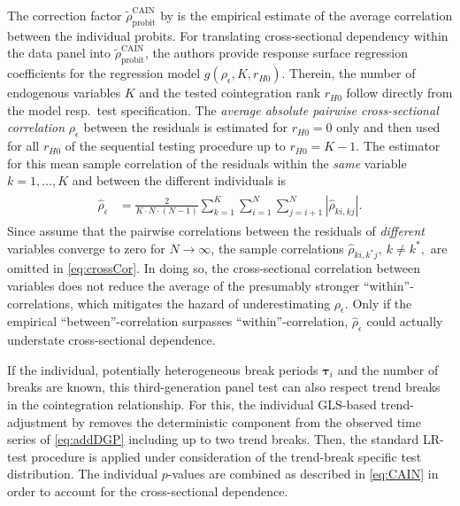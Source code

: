 The correction factor $ \tilde{\rho}^{\text{CAIN}}_\text{probit} $ by \citet{ArsovaOersal2020} is the empirical estimate of the average correlation between the individual probits. For translating cross-sectional dependency within the data panel into $ \tilde{\rho}^{\text{CAIN}}_\text{probit} $, the authors provide response surface regression coefficients for the regression model $ g\left( \rho_\epsilon, K, r_{H0} \right) $. Therein, the number of endogenous variables $ K $ and the tested cointegration rank $ r_{H0} $ follow directly from the model resp.~test specification. The \textit{average absolute pairwise cross-sectional correlation} $ \rho_\epsilon $ between the residuals is estimated for $ r_{H0} = 0 $ only and then used for all $ r_{H0} $ of the sequential testing procedure up to $ r_{H0} = K-1 $. The estimator for this mean sample correlation of the residuals within the \textit{same} variable $ k=1,\ldots,K $ and between the different individuals is
\begin{align} \label{eq:crossCor}
\begin{split}
	\hat{\rho}_\epsilon & = \frac{2}{K \cdot N \cdot (N-1)} \sum_{k=1}^{K} \sum_{i=1}^{N} \sum_{j=i+1}^{N} | \hat{\rho}_{ki,kj} |. 
\end{split}
\end{align}
Since \citet{ArsovaOersal2020} assume that the pairwise correlations between the residuals of \textit{different} variables converge to zero for $ N \to \infty $, the sample correlations $ \hat{\rho}_{ki,k^*j}, \ k \neq k^*, $ are omitted in \eqref{eq:crossCor}. In doing so, the cross-sectional correlation between variables does not reduce the average of the presumably stronger ``within''-correlations, which mitigates the hazard of underestimating $ \rho_\epsilon $. Only if the empirical ``between''-correlation surpasses ``within''-correlation, $ \hat{\rho}_\epsilon $ could actually understate cross-sectional dependence.

If the individual, potentially heterogeneous break periods $ \boldsymbol{\tau}_i $ and the number of breaks are known, this third-generation panel test can also respect trend breaks in the cointegration relationship. For this, the individual GLS-based trend-adjustment by \citet{TrenklerEtAl2008} removes the deterministic component from the observed time series of \eqref{eq:addDGP} including up to two trend breaks. Then, the standard LR-test procedure is applied under consideration of the trend-break specific test distribution. The individual $p$-values are combined as described in \eqref{eq:CAIN} in order to account for the cross-sectional dependence.



